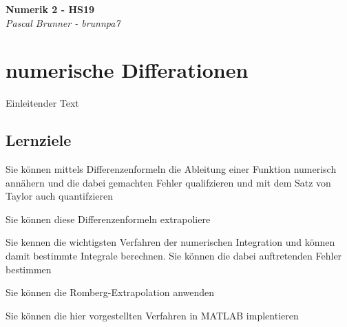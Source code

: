 \documentclass{article}
\theoremstyle{satz}
\theoremstyle{definition}
\begin{document}
\begin{titlepage}
   \begin{center}
      \Large\textbf{Numerik 2 - HS19}\\
      \large\textit{Pascal Brunner - brunnpa7}
   \end{center}
\end{titlepage}


\tableofcontents
\newpage



\section{numerische Differationen}
Einleitender Text

\subsection{Lernziele}

\begin{description}
	\item{Sie können mittels Differenzenformeln die Ableitung einer Funktion numerisch annähern und die dabei gemachten Fehler qualifzieren und mit dem Satz von Taylor auch quantifzieren}
	\item{Sie können diese Differenzenformeln extrapoliere}
	\item{Sie kennen die wichtigsten Verfahren der numerischen Integration und können damit bestimmte Integrale berechnen. Sie können die dabei auftretenden Fehler bestimmen}
	\item{Sie können die Romberg-Extrapolation anwenden}
	\item{Sie können die hier vorgestellten Verfahren in MATLAB implentieren}
\end{description}
\end{document}
